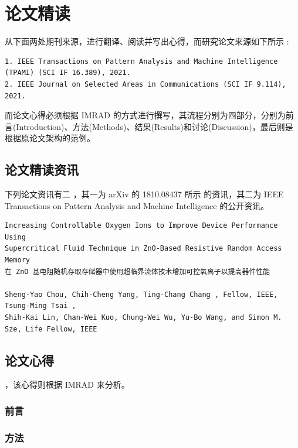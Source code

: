 \chapter{论文精读}
\label{chap:1}

从下面两处期刊来源，进行翻译、阅读并写出心得，而研究论文来源如下所示 :
\begin{Verbatim}
1. IEEE Transactions on Pattern Analysis and Machine Intelligence
(TPAMI) (SCI IF 16.389), 2021.
2. IEEE Journal on Selected Areas in Communications (SCI IF 9.114), 2021.
\end{Verbatim}

而论文心得必须根据 IMRAD 的方式进行撰写，其流程分别为四部分，分别为前言(Introduction)、方法(Methods)、结果(Results)和讨论(Discussion)，最后则是根据原论文架构的范例。

\section{论文精读资讯}

下列论文资讯有二 \cite{garcia2020admd} ，其一为 arXiv 的 1810.08437 所示 的资讯，其二为 IEEE Transactions on Pattern Analysis and Machine Intelligence 的公开资讯。

\begin{Verbatim}
Increasing Controllable Oxygen Ions to Improve Device Performance Using 
Supercritical Fluid Technique in ZnO-Based Resistive Random Access Memory
在 ZnO 基电阻随机存取存储器中使用超临界流体技术增加可控氧离子以提高器件性能

Sheng-Yao Chou, Chih-Cheng Yang, Ting-Chang Chang , Fellow, IEEE, Tsung-Ming Tsai , 
Shih-Kai Lin, Chan-Wei Kuo, Chung-Wei Wu, Yu-Bo Wang, and Simon M. Sze, Life Fellow, IEEE
\end{Verbatim}


\section{论文心得}

，该心得则根据 IMRAD 来分析。

\subsection{前言}

\subsection{方法}

